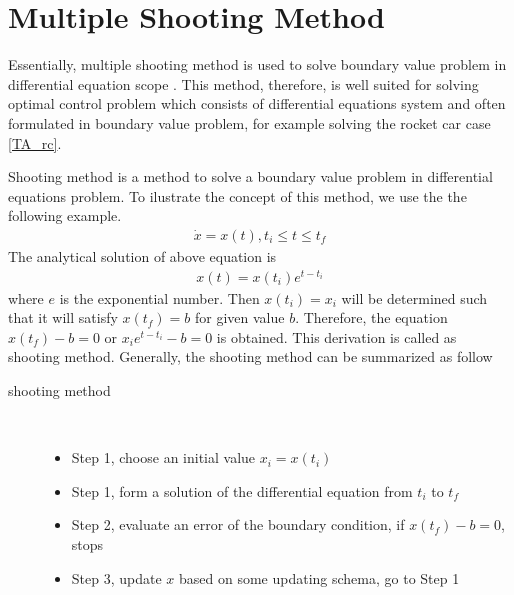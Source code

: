 \section{Multiple Shooting Method}
Essentially, multiple shooting method is used to solve boundary value problem in differential equation scope \cite{SVM12}. This method, therefore, is well suited for solving optimal control problem which consists of differential equations system and often formulated in boundary value problem, for example solving the rocket car case \ref{TA_rc}.

Shooting method is a method to solve a boundary value problem in differential equations problem. To ilustrate the concept of this method, we use the the following example.
\begin{align*}
	\dot{x} = x(t), t_i\leq t \leq t_f	
\end{align*}
The analytical solution of above equation is 
\begin{align*}
x(t) = x(t_i)e^{t - t_i}
\end{align*}
where $e$ is the exponential number. Then $x(t_i) = x_i$ will be determined such that it will satisfy
$x(t_f)=b$ for given value $b$. Therefore, the equation $x(t_f)-b = 0$ or $x_ie^{t - t_i}-b =0$ is obtained. This derivation is called as shooting method. Generally, the shooting method can be summarized as follow
\begin{description}
	\item[shooting method] \
	\begin{itemize}
		\item Step 1, choose an initial value $x_i = x(t_i)$ 
		\item Step 1, form a solution of the differential equation from $t_i$ to $t_f$
		\item Step 2, evaluate an error of the boundary condition, if $x(t_f) - b = 0$, stops 
		\item Step 3, update $x$ based on some updating schema, go to Step 1
	\end{itemize}
\end{description}


